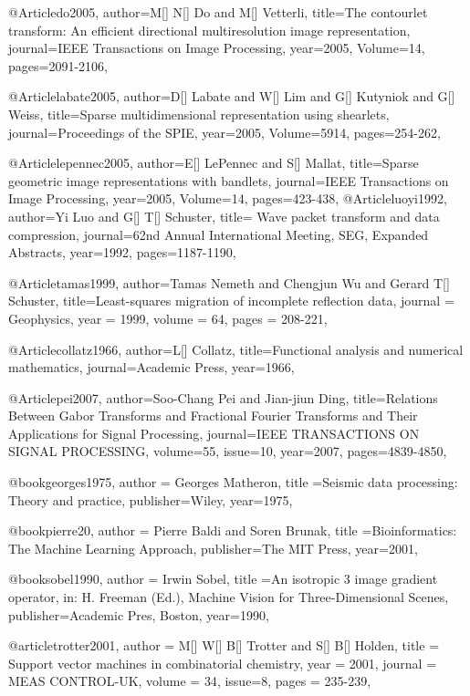 @Article{do2005,
  author={M[] N[] Do and M[] Vetterli},
  title={The contourlet transform: An efficient directional multiresolution image representation},
  journal={IEEE Transactions on Image Processing},
  year=2005,
  Volume=14,
  pages={2091-2106},
}

@Article{labate2005,
  author={D[] Labate and W[] Lim and G[] Kutyniok and G[] Weiss},
  title={Sparse multidimensional representation using shearlets},
  journal={Proceedings of the SPIE},
  year=2005,
  Volume=5914,
  pages={254-262},
}

@Article{lepennec2005,
  author={E[] LePennec and S[] Mallat},
  title={Sparse geometric image representations with bandlets},
  journal={IEEE Transactions on Image Processing},
  year=2005,
  Volume=14,
  pages={423-438},
}
@Article{luoyi1992,
  author={Yi Luo and G[] T[] Schuster},
  title={	Wave packet transform and data compression},
  journal={62nd Annual International Meeting, SEG, Expanded Abstracts},
  year=1992,
  pages={1187-1190},
}

@Article{tamas1999,
  author={Tamas Nemeth and Chengjun Wu and Gerard T[] Schuster},
  title={Least-squares migration of incomplete reflection data},
  journal = 	 {Geophysics},
  year = 	 1999,
  volume =	 64,
  pages =	 {208-221},
}

@Article{collatz1966,
author={L[] Collatz},
title={Functional analysis and numerical mathematics},
journal={Academic Press},
year=1966,
}

@Article{pei2007,
author={Soo-Chang Pei and Jian-jiun Ding},
title={Relations Between Gabor Transforms and Fractional Fourier Transforms and Their Applications for Signal Processing},
journal={IEEE TRANSACTIONS ON SIGNAL PROCESSING},
volume=55,
issue=10,
year=2007,
pages={4839-4850},
}

@book{georges1975,
  author = {Georges Matheron},
  title ={Seismic data processing: Theory and practice},
  publisher={Wiley},
  year=1975,
}

@book{pierre20,
  author = {Pierre Baldi and Soren Brunak},
  title ={Bioinformatics: The Machine Learning Approach},
  publisher={The MIT Press},
  year=2001,
}


@book{sobel1990,
  author = {Irwin Sobel},
  title ={An isotropic 3 image gradient operator, in: H. Freeman (Ed.), Machine Vision for Three-Dimensional Scenes},
  publisher={Academic Pres, Boston},
  year=1990,
}


@article{trotter2001,
author = {M[] W[] B[] Trotter and S[] B[] Holden},
title = {Support vector machines in combinatorial chemistry},
year = {2001},
journal = {MEAS CONTROL-UK},
volume = {34},
issue=8,
pages = {235-239},
}

